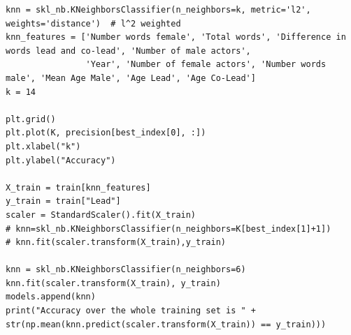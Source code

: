\documentclass{article}
\begin{document}
\begin{verbatim}
knn = skl_nb.KNeighborsClassifier(n_neighbors=k, metric='l2', weights='distance')  # l^2 weighted
knn_features = ['Number words female', 'Total words', 'Difference in words lead and co-lead', 'Number of male actors',
                'Year', 'Number of female actors', 'Number words male', 'Mean Age Male', 'Age Lead', 'Age Co-Lead']
k = 14

plt.grid()
plt.plot(K, precision[best_index[0], :])
plt.xlabel("k")
plt.ylabel("Accuracy")

X_train = train[knn_features]
y_train = train["Lead"]
scaler = StandardScaler().fit(X_train)
# knn=skl_nb.KNeighborsClassifier(n_neighbors=K[best_index[1]+1])
# knn.fit(scaler.transform(X_train),y_train)

knn = skl_nb.KNeighborsClassifier(n_neighbors=6)
knn.fit(scaler.transform(X_train), y_train)
models.append(knn)
print("Accuracy over the whole training set is " + str(np.mean(knn.predict(scaler.transform(X_train)) == y_train)))
\end{verbatim}
\end{document}
